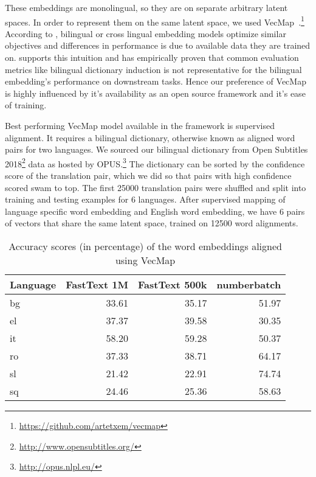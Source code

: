 These embeddings are monolingual, so they are on separate arbitrary latent spaces.
In order to represent them on the same latent space, we used VecMap~\cite{artetxe_robust_2018,artetxe_generalizing_2018,artetxe_learning_2017,artetxe_learning_2016}.\footnote{\url{https://github.com/artetxem/vecmap}}
According to \textcite{ruder_survey_2017}, bilingual or cross lingual embedding models optimize similar objectives and differences in performance is due to available data they are trained on.
\textcite{glavas_how_2019} supports this intuition and has empirically proven that common evaluation metrics like bilingual dictionary induction is not representative for the bilingual embedding's performance on downstream tasks.
Hence our preference of VecMap is highly influenced by it's availability as an open source framework and it's ease of training.

Best performing VecMap model available in the framework is supervised alignment.
It requires a bilingual dictionary, otherwise known as aligned word pairs for two languages.
We sourced our bilingual dictionary from Open Subtitles 2018\footnote{\url{http://www.opensubtitles.org/}} data as hosted by OPUS.\footnote{\url{http://opus.nlpl.eu/}}
The dictionary can be sorted by the confidence score of the translation pair, which we did so that pairs with high confidence scored swam to top.
The first 25000 translation pairs were shuffled and split into training and testing examples for 6 languages.
After supervised mapping of language specific word embedding and English word embedding, we have 6 pairs of vectors that share the same latent space, trained on 12500 word alignments.

\begin{table}[htbp]
    \centering
    \begin{tabular}{lrrr}
        \toprule
        \textbf{Language} & \textbf{FastText 1M} & \textbf{FastText 500k} & \textbf{numberbatch} \\
        \midrule
        bg & 33.61 & 35.17 & 51.97 \\
        el & 37.37 & 39.58 & 30.35 \\
        it & 58.20 & 59.28 & 50.37 \\
        ro & 37.33 & 38.71 & 64.17 \\
        sl & 21.42 & 22.91 & 74.74 \\
        sq & 24.46 & 25.36 & 58.63 \\
        \bottomrule
    \end{tabular}
    \caption{Accuracy scores (in percentage) of the word embeddings aligned using VecMap}%
    \label{tab:accuracy_results}
\end{table}

